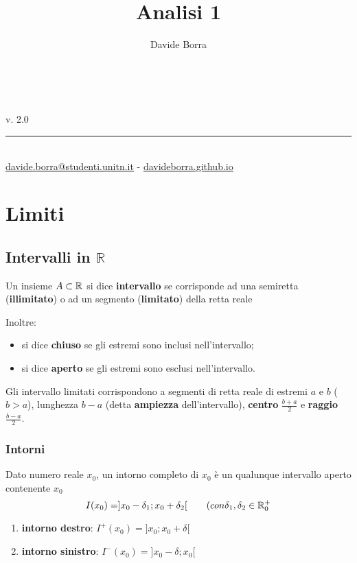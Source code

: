 \documentclass{book}     %
\title{Analisi 1}
\author{Davide Borra}
\date{}
\makeatletter
\let\runauthor\@author
\let\runtitle\@title
\makeatother
\begin{document}
\lhead{}
\chead{}
\rfoot{\runauthor}

\begin{titlepage}
    \pagestyle{empty}
    \begin{center}
        \vspace*{\fill}
        \vspace{0.5cm}
        \textbf{\Huge \runtitle}\\\vspace{5mm}
        \textsc{\Large \runauthor}
        \vspace{5cm}
    \end{center}
    \vspace*{\fill}
    v. 2.0\\
    \rule{0.8\linewidth}{0.5mm}\\
    {\footnotesize\href{mailto:davide.borra@studenti.unitn.it}{davide.borra@studenti.unitn.it} - \href{http://davideborra.github.io}{davideborra.github.io}}
    \restoregeometry
\end{titlepage}
\thispagestyle{empty}
\frontmatter
    \tableofcontents
    \creativecommons
\mainmatter
{}
\chead{}
\rhead{\leftmark\ - \rightmark}
\rfoot{\runauthor}

\chapter{Limiti}
\section{Intervalli in $\mathbb{R}$}
\begin{boxdef}
    Un insieme $A \subset \mathbb{R}$ si dice \textbf{intervallo} se corrisponde ad una semiretta (\textbf{illimitato}) o ad un segmento (\textbf{limitato}) della retta reale
\end{boxdef}
Inoltre:
\begin{itemize}
    \item si dice \textbf{chiuso} se gli estremi sono inclusi nell'intervallo;
    \item si dice \textbf{aperto} se gli estremi sono esclusi nell'intervallo.
\end{itemize}
Gli intervallo limitati corrispondono a segmenti di retta reale di estremi $a$ e $b$ ($b>a$), lunghezza $b-a$ (detta \textbf{ampiezza} dell'intervallo), \textbf{centro} $\frac{b+a}{2}$ e \textbf{raggio} $\frac{b-a}{2}$.
\subsection{Intorni}
\begin{boxdef}
    Dato numero reale $x_0$, un intorno completo di $x_0$ è un qualunque intervallo aperto contenente $x_0$ \[I(x_0)=]x_0-\delta_1;x_0+\delta_2[ ~~~~~~ (con \delta_1, \delta_2 \in \mathbb{R}_0^+\]
\end{boxdef}
\begin{enumerate}
    \item \textbf{intorno destro}: $I^+(x_0)=]x_0;x_0+\delta[$
    \item \textbf{intorno sinistro}: $I^-(x_0)=]x_0-\delta;x_0[$
\end{enumerate}
\end{document}
